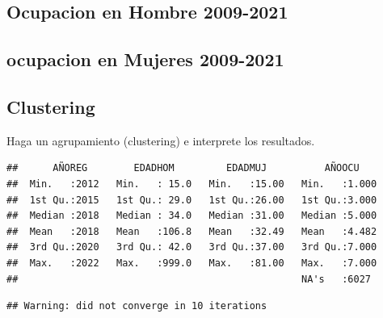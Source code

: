 \documentclass[
]{article}
\newenvironment{Shaded}{\begin{snugshade}}{\end{snugshade}}
\newcommand{\FunctionTok}[1]{\textcolor[rgb]{0.00,0.00,0.00}{#1}}
\newcommand{\NormalTok}[1]{#1}
\newcommand{\OtherTok}[1]{\textcolor[rgb]{0.56,0.35,0.01}{#1}}
\newcommand{\SpecialCharTok}[1]{\textcolor[rgb]{0.00,0.00,0.00}{#1}}
\newcommand{\StringTok}[1]{\textcolor[rgb]{0.31,0.60,0.02}{#1}}
\begin{document}
\hypertarget{ocupacion-en-hombre-2009-2021}{%
\subsection{Ocupacion en Hombre
2009-2021}\label{ocupacion-en-hombre-2009-2021}}

\hypertarget{ocupacion-en-mujeres-2009-2021}{%
\subsection{ocupacion en Mujeres
2009-2021}\label{ocupacion-en-mujeres-2009-2021}}

\hypertarget{clustering}{%
\subsection{Clustering}\label{clustering}}

Haga un agrupamiento (clustering) e interprete los resultados.

\begin{Shaded}
\end{Shaded}

\begin{verbatim}
##      AÑOREG        EDADHOM         EDADMUJ          AÑOOCU     
##  Min.   :2012   Min.   : 15.0   Min.   :15.00   Min.   :1.000  
##  1st Qu.:2015   1st Qu.: 29.0   1st Qu.:26.00   1st Qu.:3.000  
##  Median :2018   Median : 34.0   Median :31.00   Median :5.000  
##  Mean   :2018   Mean   :106.8   Mean   :32.49   Mean   :4.482  
##  3rd Qu.:2020   3rd Qu.: 42.0   3rd Qu.:37.00   3rd Qu.:7.000  
##  Max.   :2022   Max.   :999.0   Max.   :81.00   Max.   :7.000  
##                                                 NA's   :6027
\end{verbatim}

\begin{verbatim}
## Warning: did not converge in 10 iterations
\end{verbatim}
\end{document}
